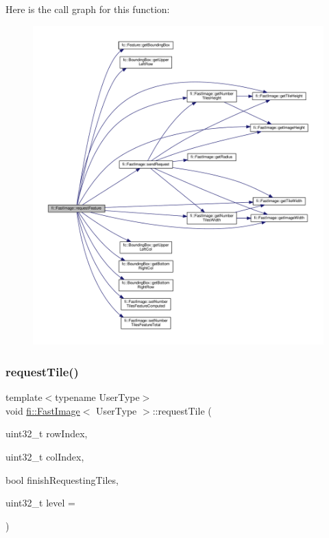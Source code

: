 Here is the call graph for this function\+:
\nopagebreak
\begin{figure}[H]
\begin{center}
\leavevmode
\includegraphics[width=350pt]{dc/d6b/classfi_1_1FastImage_abd44908134edad1df4a61faec9cdbf9e_cgraph}
\end{center}
\end{figure}
\mbox{\label{classfi_1_1FastImage_a595c22ba44ba635133c7a20cbd4e2d13}} 
\subsubsection{\texorpdfstring{request\+Tile()}{requestTile()}}
{\footnotesize\ttfamily template$<$typename User\+Type$>$ \\
void \hyperlink{classfi_1_1FastImage}{fi\+::\+Fast\+Image}$<$ User\+Type $>$\+::request\+Tile (\begin{DoxyParamCaption}\item[{uint32\+\_\+t}]{row\+Index,  }\item[{uint32\+\_\+t}]{col\+Index,  }\item[{bool}]{finish\+Requesting\+Tiles,  }\item[{uint32\+\_\+t}]{level = {} }\end{DoxyParamCaption})\hspace{0.3cm}{\ttfamily [inline]}}




